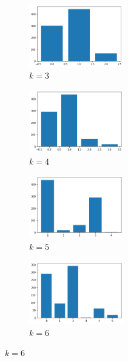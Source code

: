 \begin{figure}[H]
\begin{subfigure}{.5\textwidth}
  \centering
  \includegraphics[width=0.45\textwidth]{imagenes/counter/salida/km3.png}
  \caption{$k=3$}
\end{subfigure}%
\begin{subfigure}{.5\textwidth}
  \centering
  \includegraphics[width=0.45\textwidth]{imagenes/counter/salida/km4.png}
  \caption{$k=4$}
\end{subfigure}
\begin{subfigure}{.5\textwidth}
  \centering
  \includegraphics[width=0.45\textwidth]{imagenes/counter/salida/km5.png}
  \caption{$k=5$}
\end{subfigure}
\begin{subfigure}{.5\textwidth}
  \centering
  \includegraphics[width=0.45\textwidth]{imagenes/counter/salida/km6.png}
  \caption{$k=6$}

\end{subfigure}
\end{figure}
